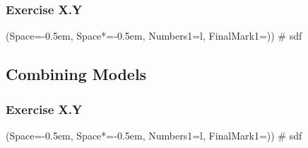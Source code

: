 \documentclass[12pt, a4paper]{article}
\newcommand{\listSpace}{-0.5em}%
\begin{document}
\subsubsection*{Exercise X.Y}
\begin{easylist}[enumerate]
	\ListProperties(Space=\listSpace, Space*=\listSpace, Numbers1=l, FinalMark1={)})
	# sdf
\end{easylist}

\subsection{Combining Models}
\subsubsection*{Exercise X.Y}
\begin{easylist}[enumerate]
	\ListProperties(Space=\listSpace, Space*=\listSpace, Numbers1=l, FinalMark1={)})
	# sdf
\end{easylist}





































\end{document}
